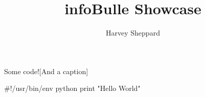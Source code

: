 \documentclass{memoir}
\title{infoBulle Showcase}
\author{Harvey Sheppard}
\begin{document}
	
	\maketitle
	
	
	
	
	
	
	\begin{CodeInfo}{Some code!}[And a caption]
		\begin{CodeInfoLst}
#!/usr/bin/env python
print "Hello World"
		\end{CodeInfoLst}
		\lipsum[2]
	\end{CodeInfo}
	
	
\end{document}
